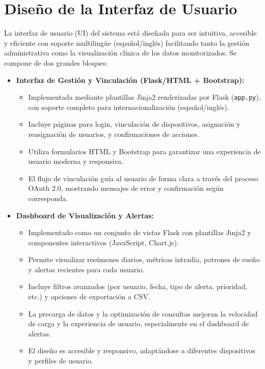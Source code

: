 \section{Diseño de la Interfaz de Usuario}
\label{sec:diseno_ui}

La interfaz de usuario (UI) del sistema está diseñada para ser intuitiva, accesible y eficiente con soporte multilingüe (español/inglés) facilitando tanto la gestión administrativa como la visualización clínica de los datos monitorizados. Se compone de dos grandes bloques:

\begin{itemize}
    \item \textbf{Interfaz de Gestión y Vinculación (Flask/HTML + Bootstrap):}
        \begin{itemize}
            \item Implementada mediante plantillas Jinja2 renderizadas por Flask (\texttt{app.py}), con soporte completo para internacionalización (español/inglés).
            \item Incluye páginas para login, vinculación de dispositivos, asignación y reasignación de usuarios, y confirmaciones de acciones.
            \item Utiliza formularios HTML y Bootstrap para garantizar una experiencia de usuario moderna y responsiva.
            \item El flujo de vinculación guía al usuario de forma clara a través del proceso OAuth 2.0, mostrando mensajes de error y confirmación según corresponda.
        \end{itemize}
    \item \textbf{Dashboard de Visualización y Alertas:}
        \begin{itemize}
            \item Implementado como un conjunto de vistas Flask con plantillas Jinja2 y componentes interactivos (JavaScript, Chart.js).
            \item Permite visualizar resúmenes diarios, métricas intradía, patrones de sueño y alertas recientes para cada usuario.
            \item Incluye filtros avanzados (por usuario, fecha, tipo de alerta, prioridad, etc.) y opciones de exportación a CSV.
            \item La precarga de datos y la optimización de consultas mejoran la velocidad de carga y la experiencia de usuario, especialmente en el dashboard de alertas.
            \item El diseño es accesible y responsivo, adaptándose a diferentes dispositivos y perfiles de usuario.
        \end{itemize}
\end{itemize}

